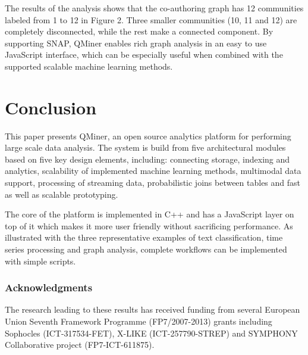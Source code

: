 \documentclass{article} %
\begin{document}
The results of the analysis shows that the co-authoring graph has 12 communities labeled from 1 to 12 in Figure 2. Three smaller communities (10, 11 and 12) are completely disconnected, while the rest make a connected component. By supporting SNAP, QMiner enables rich graph analysis in an easy to use JavaScript interface, which can be especially useful when combined with the supported scalable machine learning methods.

\section{Conclusion}
\label{sec:conclusions}

This paper presents QMiner, an open source analytics platform for performing large scale data analysis. The system is build from five architectural modules based on five key design elements, including: connecting storage, indexing and analytics, scalability of implemented machine learning methods, multimodal data support, processing of streaming data, probabilistic joins between tables and fast as well as scalable prototyping.

The core of the platform is implemented in C++ and has a JavaScript layer on top of it which makes it more user friendly without sacrificing performance. As illustrated with the three representative examples of text classification, time series processing and graph analysis, complete workflows can be implemented with simple scripts.

\subsubsection*{Acknowledgments}
The research leading to these results has received funding from several European Union Seventh Framework Programme (FP7/2007-2013) grants including Sophocles (ICT-317534-FET), X-LIKE (ICT-257790-STREP) and SYMPHONY Collaborative project (FP7-ICT-611875).



\end{document}
